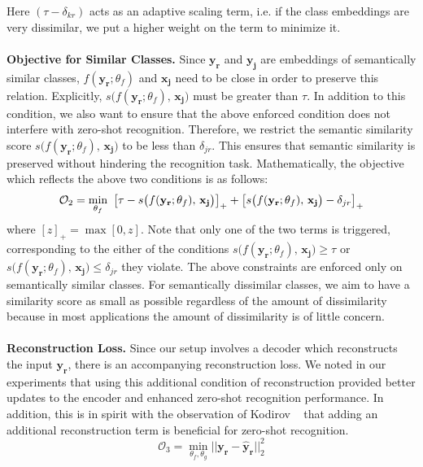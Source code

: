 \documentclass[10pt,twocolumn,letterpaper]{article}
\begin{document}
Here $(\tau-\delta_{kr})$ acts as an adaptive scaling term, i.e. if the class embeddings are very dissimilar, we put a higher weight on the term to minimize it.\\\\
\textbf{Objective for Similar Classes.} Since $\mathbf{y_r}$ and $\mathbf{y_j}$ are embeddings of semantically similar classes, $f(\mathbf{y_r};\theta_f)$ and $\mathbf{x_j}$ need to be close in order to preserve this relation. 
Explicitly, $s\big(f(\mathbf{y_r}; \theta_f),\,\mathbf{x_j}\big)$ must be greater than $\tau$. In addition to this condition, we also want to ensure that the above enforced condition does not interfere with zero-shot recognition. Therefore, we restrict the semantic similarity score $s\big(f(\mathbf{y_r}; \theta_f),\,\mathbf{x_j}\big)$ to be  less than $\delta_{jr}$. 
This ensures that semantic similarity is preserved without hindering the recognition task. Mathematically, the objective which reflects the above two conditions is as follows:
\begin{equation}
\label{structure}
\mathcal{O}_2 = \min_{\theta_f}\  \small{\big[\tau - s\big(f(\mathbf{y_r}; \theta_f),\,\mathbf{x_j}\big)\big]_+ + \big[s\big(f(\mathbf{y_r};\theta_f),\,\mathbf{x_j}\big) - \delta_{jr}\big]_+}
\end{equation}
where $[z]_+ = \max[0,z]$. Note that only one of the two terms is triggered, corresponding to the either of the conditions $s\big(f(\mathbf{y_r};\theta_f),\,\mathbf{x_j}\big) \geq \tau$ or $s\big(f(\mathbf{y_r};\theta_f),\,\mathbf{x_j}\big) \leq \delta_{jr}$ they violate. 
The above constraints are enforced only on semantically similar classes. 
For semantically dissimilar classes, we aim to have a similarity score as small as possible regardless of the amount of dissimilarity because in most applications the amount of dissimilarity is of little concern.\\\\
\textbf{Reconstruction Loss.}
Since our setup involves a decoder which reconstructs the input $\mathbf{y_r}$, there is an accompanying reconstruction loss. We noted in our experiments that using this additional condition of reconstruction provided better updates to the encoder and enhanced zero-shot recognition performance. In addition, this is in spirit with the observation of Kodirov \etal~\cite{Kodirov_2017_CVPR} that adding an additional reconstruction term is beneficial for zero-shot recognition. 
\begin{equation}
\label{recons}
\mathcal{O}_3 = \min_{\theta_f, \theta_g} ||\mathbf{y_r} - \mathbf{\hat y_r}||_2^2
\end{equation} 
\end{document}

